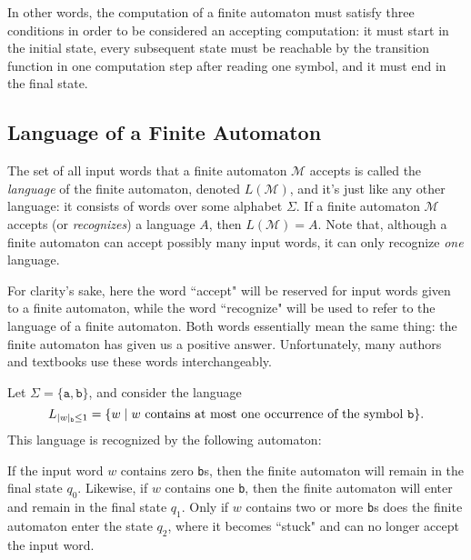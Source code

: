 In other words, the computation of a finite automaton must satisfy three conditions in order to be considered an accepting computation: it must start in the initial state, every subsequent state must be reachable by the transition function in one computation step after reading one symbol, and it must end in the final state.

\subsection{Language of a Finite Automaton}

The set of all input words that a finite automaton $\mathcal{M}$ accepts is called the \emph{language} of the finite automaton, denoted $L(\mathcal{M})$, and it's just like any other language: it consists of words over some alphabet $\Sigma$. If a finite automaton $\mathcal{M}$ accepts (or \emph{recognizes}) a language $A$, then $L(\mathcal{M}) = A$. Note that, although a finite automaton can accept possibly many input words, it can only recognize \emph{one} language.

\begin{remark}
For clarity's sake, here the word ``accept" will be reserved for input words given to a finite automaton, while the word ``recognize" will be used to refer to the language of a finite automaton. Both words essentially mean the same thing: the finite automaton has given us a positive answer. Unfortunately, many authors and textbooks use these words interchangeably.
\end{remark}

\begin{example}
Let $\Sigma = \{\texttt{a}, \texttt{b}\}$, and consider the language
\begin{equation*}
L_{|w|_{\texttt{b}}\leq1} = \{w \mid w \text{ contains at most one occurrence of the symbol \texttt{b}}\}.
\end{equation*}
This language is recognized by the following automaton:
\begin{center}
\end{center}
If the input word $w$ contains zero \texttt{b}s, then the finite automaton will remain in the final state $q_{0}$. Likewise, if $w$ contains one \texttt{b}, then the finite automaton will enter and remain in the final state $q_{1}$. Only if $w$ contains two or more \texttt{b}s does the finite automaton enter the state $q_{2}$, where it becomes ``stuck" and can no longer accept the input word.
\end{example}

